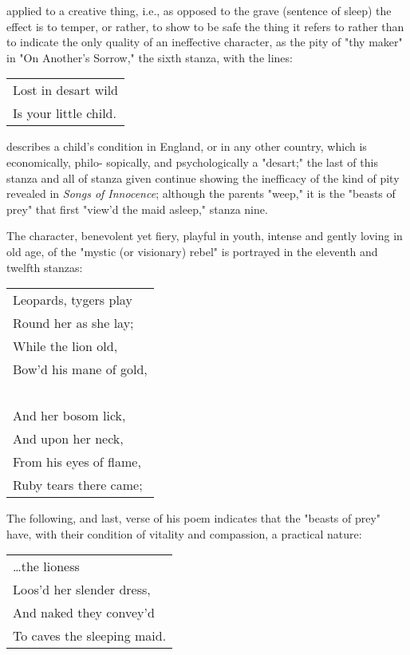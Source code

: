 \noindent applied to a creative thing, i.e., as opposed to the grave (sentence of sleep) the effect is to temper,
or rather, to show to be safe the thing it refers to rather than to indicate the only quality of an ineffective
character, as the pity of "thy maker" in "On Another's Sorrow," the sixth stanza, with the lines:\par
\begin{center}
	\begin{tabular}{l}
		Lost in desart wild \\
		Is your little child.
	\end{tabular}
\end{center}
describes a child's condition in England, or in any other country, which is
economically, philo-\linebreak
sopically, and psychologically a "desart;" the last of this stanza and all
of stanza given continue showing the inefficacy of the kind of pity revealed in \textit{Songs of Innocence};
although the parents "weep," it is the "beasts of prey" that first "view'd the maid asleep," stanza nine.\par
\vspace*{0.5\baselineskip}
The character, benevolent yet fiery, playful in youth, intense and gently loving in old age, of the "mystic
(or visionary) rebel" is portrayed in the eleventh and twelfth stanzas:\par
\begin{center}
	\begin{tabular}{l}
		Leopards, tygers play   \\
		Round her as she lay;   \\
		While the lion old,     \\
		Bow'd his mane of gold, \\
		~                       \\
		And her bosom lick,     \\
		And upon her neck,      \\
		From his eyes of flame, \\
		Ruby tears there came;
	\end{tabular}
\end{center}
\hspace*{5mm}The following, and last, verse of his poem indicates that the "beasts of prey" have, with their
condition of vitality and compassion, a practical nature:\par
\begin{center}
	\begin{tabular}{l}
		\dots the lioness         \\
		Loos'd her slender dress, \\
		And naked they convey'd   \\
		To caves the sleeping maid.
	\end{tabular}
\end{center}
